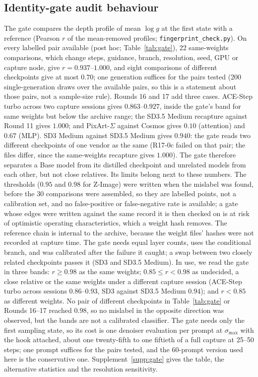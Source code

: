 \documentclass[11pt]{article}
\begin{document}
\subsection{Identity-gate audit behaviour}\label{sec:gate}
The gate compares the depth profile of mean $\log g$ at the first state with a reference (Pearson $r$ of the mean-removed profiles; \texttt{fingerprint\_check.py}). On every labelled pair available (post hoc; Table~\ref{tab:gate}), 22 same-weights comparisons, which change steps, guidance, branch, resolution, seed, GPU or capture node, give $r=0.937$--$1.000$, and eight comparisons of different checkpoints give at most $0.70$; one generation suffices for the pairs tested (200 single-generation draws over the available pairs, so this is a statement about those pairs, not a sample-size rule). Rounds 16 and 17 add three cases. ACE-Step turbo across two capture sessions gives $0.863$--$0.927$, inside the gate's band for same weights but below the archive range; the SD3.5 Medium recapture against Round 11 gives $1.000$; and PixArt-$\Sigma$ against Cosmos gives $0.10$ (attention) and $0.67$ (MLP). SD3 Medium against SD3.5 Medium gives $0.940$: the gate reads two different checkpoints of one vendor as the same (R17-0c failed on that pair; the files differ, since the same-weights recapture gives $1.000$). The gate therefore separates a Base model from its distilled checkpoint and unrelated models from each other, but not close relatives. Its limits belong next to these numbers. The thresholds ($0.95$ and $0.98$ for Z-Image) were written when the mislabel was found, before the 30 comparisons were assembled, so they are labelled points, not a calibration set, and no false-positive or false-negative rate is available; a gate whose edges were written against the same record it is then checked on is at risk of optimistic operating characteristics, which a weight hash removes. The reference chain is internal to the archive, because the weight files' hashes were not recorded at capture time. The gate needs equal layer counts, uses the conditional branch, and was calibrated after the failure it caught; a swap between two closely related checkpoints passes it (SD3 and SD3.5 Medium). In use, we read the gate in three bands: $r\ge0.98$ as the same weights; $0.85\le r<0.98$ as undecided, a close relative or the same weights under a different capture session (ACE-Step turbo across sessions $0.86$--$0.93$, SD3 against SD3.5 Medium $0.94$); and $r<0.85$ as different weights. No pair of different checkpoints in Table~\ref{tab:gate} or Rounds 16--17 reached $0.98$, so no mislabel in the opposite direction was observed, but the bands are not a calibrated classifier. The gate needs only the first sampling state, so its cost is one denoiser evaluation per prompt at $\sigma_{\max}$ with the hook attached, about one twenty-fifth to one fiftieth of a full capture at 25--50 steps; one prompt suffices for the pairs tested, and the 60-prompt version used here is the conservative one. Supplement~\ref{supp:gate} gives the table, the alternative statistics and the resolution sensitivity.
\end{document}
